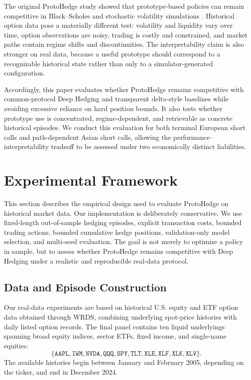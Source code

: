 \documentclass[sigconf]{acmart}
\begin{document}
The original ProtoHedge study showed that prototype-based policies can remain
competitive in Black--Scholes and stochastic volatility simulations
\cite{faloughi2025protohedge}. Historical
option data pose a materially different test: volatility and liquidity vary
over time, option observations are noisy, trading is costly and constrained,
and market paths contain regime shifts and discontinuities. The
interpretability claim is also stronger on real data, because a useful
prototype should correspond to a recognizable historical state rather than
only to a simulator-generated configuration.

Accordingly, this paper evaluates whether ProtoHedge remains competitive with
common-protocol Deep Hedging and transparent delta-style baselines while
avoiding excessive reliance on hard position bounds. It also tests whether
prototype use is concentrated, regime-dependent, and retrievable as concrete
historical episodes. We conduct this evaluation for both terminal European
short calls and path-dependent Asian short calls, allowing the
performance--interpretability tradeoff to be assessed under two economically
distinct liabilities.












\section{Experimental Framework}
\label{sec:experimental_framework}

This section describes the empirical design used to evaluate ProtoHedge on historical market data. Our implementation is deliberately conservative. We use fixed-length out-of-sample hedging episodes, explicit transaction costs, bounded trading actions, bounded cumulative hedge positions, validation-only model selection, and multi-seed evaluation. The goal is not merely to optimize a policy in sample, but to assess whether ProtoHedge remains competitive with Deep Hedging under a realistic and reproducible real-data protocol.

\subsection{Data and Episode Construction}
\label{subsec:data_episode_construction}

Our real-data experiments are based on historical U.S. equity and ETF option data obtained through WRDS, combining underlying spot-price histories with daily listed option records. The final panel contains ten liquid underlyings spanning broad equity indices, sector ETFs, fixed income, and single-name equities:
\[
\{\texttt{AAPL}, \texttt{IWM}, \texttt{NVDA}, \texttt{QQQ}, \texttt{SPY}, \texttt{TLT}, \texttt{XLE}, \texttt{XLF}, \texttt{XLK}, \texttt{XLV}\}.
\]
The available histories begin between January and February 2005, depending on
the ticker, and end in December 2024.
\end{document}

